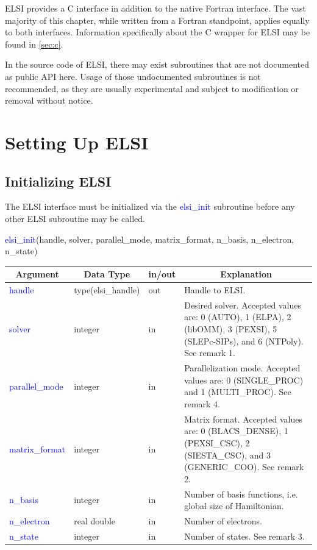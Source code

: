 \documentclass{report}
\begin{document}
ELSI provides a C interface in addition to the native Fortran interface.  The vast majority of this chapter, while written from a Fortran standpoint, applies equally to both interfaces.  Information specifically about the C wrapper for ELSI may be found in \ref{sec:c}.

In the source code of ELSI, there may exist subroutines that are not documented as public API here.  Usage of those undocumented subroutines is not recommended, as they are usually experimental and subject to modification or removal without notice.

\section{Setting Up ELSI}
\label{sec:setup}
\subsection{Initializing ELSI}
\label{subsec:setup_init}
The ELSI interface must be initialized via the \textcolor{blue}{elsi\_init} subroutine before any other ELSI subroutine may be called.
\begin{labeling}{\hspace{6cm}}
\item [\hspace{0.3cm} \textcolor{blue}{elsi\_init}(handle, solver, parallel\_mode, matrix\_format, n\_basis, n\_electron, n\_state)]
\end{labeling}

\begin{tabular}[]{|p{30mm}|p{30mm}|p{15mm}|p{90mm}|}
\hline
\multicolumn{1}{|c|}{\textbf{Argument}} & \multicolumn{1}{c|}{\textbf{Data Type}} & \multicolumn{1}{c|}{\textbf{in/out}} & \multicolumn{1}{c|}{\textbf{Explanation}}\\
\hline
\textcolor{blue}{handle}         & type(elsi\_handle) & out & Handle to ELSI.\\
\hline
\textcolor{blue}{solver}         & integer            & in  & Desired solver.  Accepted values are:  0 (AUTO), 1 (ELPA), 2 (libOMM), 3 (PEXSI), 5 (SLEPc-SIPs), and 6 (NTPoly).  See remark 1.\\
\hline
\textcolor{blue}{parallel\_mode} & integer            & in  & Parallelization mode.  Accepted values are:  0 (SINGLE\_PROC) and 1 (MULTI\_PROC).  See remark 4.\\
\hline
\textcolor{blue}{matrix\_format} & integer            & in  & Matrix format.  Accepted values are:  0 (BLACS\_DENSE), 1 (PEXSI\_CSC), 2 (SIESTA\_CSC), and 3 (GENERIC\_COO).  See remark 2.\\
\hline
\textcolor{blue}{n\_basis}       & integer            & in  & Number of basis functions, i.e. global size of Hamiltonian.\\
\hline
\textcolor{blue}{n\_electron}    & real double        & in  & Number of electrons.\\
\hline
\textcolor{blue}{n\_state}       & integer            & in  & Number of states.  See remark 3.\\
\hline
\end{tabular}
\end{document}
